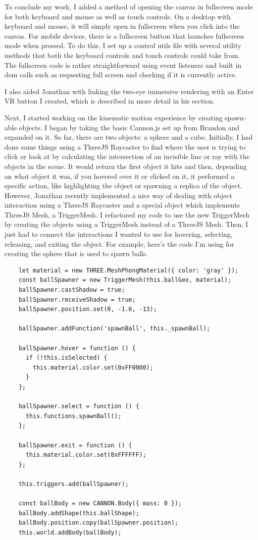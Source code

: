 \documentclass[onecolumn, draftclsnofoot,10pt, compsoc]{IEEEtran}
\begin{document}
To conclude my work, I added a method of opening the canvas in fullscreen mode for both keyboard and mouse as well as touch controls. On a desktop with keyboard and mouse, it will simply open in fullscreen when you click into the canvas. For mobile devices, there is a fullscreen button that launches fullscreen mode when pressed. To do this, I set up a control utils file with several utility methods that both the keyboard controls and touch controls could take from. The fullscreen code is rather straightforward using event listeners and built in dom calls such as requesting full screen and checking if it is currently active.

I also aided Jonathan with linking the two-eye immersive rendering with an Enter VR button I created, which is described in more detail in his section.

Next, I started working on the kinematic motion experience by creating spawn-able objects. I began by taking the basic Cannon.js set up from Brandon and expanded on it. So far, there are two objects: a sphere and a cube. Initially, I had done some things using a ThreeJS Raycaster to find where the user is trying to click or look at by calculating the intersection of an invisible line or ray with the objects in the scene. It would return the first object it hits and then, depending on what object it was, if you hovered over it or clicked on it, it performed a specific action, like highlighting the object or spawning a replica of the object. However, Jonathan recently implemented a nice way of dealing with object interaction using a ThreeJS Raycaster and a special object which implements ThreeJS Mesh, a TriggerMesh. I refactored my code to use the new TriggerMesh by creating the objects using a TriggerMesh instead of a ThreeJS Mesh. Then, I just had to connect the interactions I wanted to use for hovering, selecting, releasing, and exiting the object. For example, here's the code I'm using for creating the sphere that is used to spawn balls.
 
\begin{lstlisting}
    let material = new THREE.MeshPhongMaterial({ color: 'gray' });
    const ballSpawner = new TriggerMesh(this.ballGeo, material);
    ballSpawner.castShadow = true;
    ballSpawner.receiveShadow = true;
    ballSpawner.position.set(0, -1.6, -13);

    ballSpawner.addFunction('spawnBall', this._spawnBall);

    ballSpawner.hover = function () {
      if (!this.isSelected) {
        this.material.color.set(0xFF0000);
      }
    };

    ballSpawner.select = function () {
      this.functions.spawnBall();
    };

    ballSpawner.exit = function () {
      this.material.color.set(0xFFFFFF);
    };

    this.triggers.add(ballSpawner);

    const ballBody = new CANNON.Body({ mass: 0 });
    ballBody.addShape(this.ballShape);
    ballBody.position.copy(ballSpawner.position);
    this.world.addBody(ballBody);
\end{lstlisting}
\end{document}
